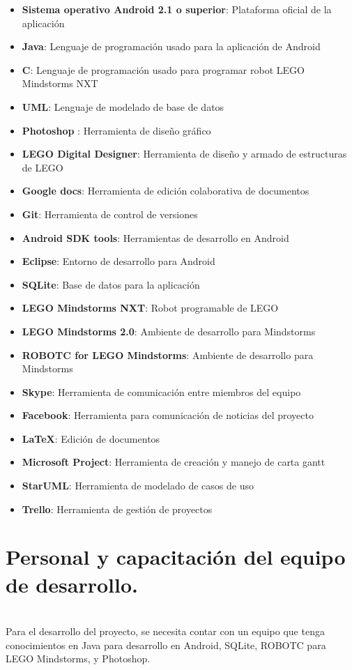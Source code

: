 \begin{itemize}
    \item {\bf Sistema operativo Android 2.1 o superior}: Plataforma oficial de la aplicaci\'on
    \item {\bf Java}: Lenguaje de programaci\'on usado para la aplicaci\'on de Android
    \item {\bf C}: Lenguaje de programaci\'on usado para programar robot LEGO Mindstorms NXT
    \item {\bf UML}: Lenguaje de modelado de base de datos
    \item {\bf Photoshop }: Herramienta de dise\~no gr\'afico
    \item {\bf LEGO Digital Designer}: Herramienta de dise\~no y armado de estructuras de LEGO
    \item {\bf Google docs}: Herramienta de edici\'on colaborativa de documentos
    \item {\bf Git}: Herramienta de control de versiones
    \item {\bf Android SDK tools}: Herramientas de desarrollo en Android
    \item {\bf Eclipse}: Entorno de desarrollo para Android
    \item {\bf SQLite}: Base de datos para la aplicaci\'on
    \item {\bf LEGO Mindstorms NXT}: Robot programable de LEGO
    \item {\bf LEGO Mindstorms 2.0}: Ambiente de desarrollo para Mindstorms
    \item {\bf ROBOTC for LEGO Mindstorms}: Ambiente de desarrollo para Mindstorms
    \item {\bf Skype}: Herramienta de comunicaci\'on entre miembros del equipo
    \item {\bf Facebook}: Herramienta para comunicaci\'on de noticias del proyecto
    \item {\bf \LaTeX}: Edici\'on de documentos
    \item {\bf Microsoft Project}: Herramienta de creaci\'on y manejo de carta gantt
    \item {\bf StarUML}: Herramienta de modelado de casos de uso
    \item {\bf Trello}: Herramienta de gesti\'on de proyectos
\end{itemize}

\newpage
\section{Personal y capacitaci\'on del equipo de desarrollo.}
~\\
Para el desarrollo del proyecto, se necesita contar con un equipo que tenga conocimientos en Java para desarrollo en Android, SQLite, ROBOTC para LEGO Mindstorms, y Photoshop. 

